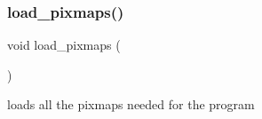 \mbox{\label{group__XPM_gad2044d84c92e452614c589961960e3f2}} 
\subsubsection{\texorpdfstring{load\+\_\+pixmaps()}{load\_pixmaps()}}
{\footnotesize\ttfamily void load\+\_\+pixmaps (\begin{DoxyParamCaption}{ }\end{DoxyParamCaption})}



loads all the pixmaps needed for the program 


